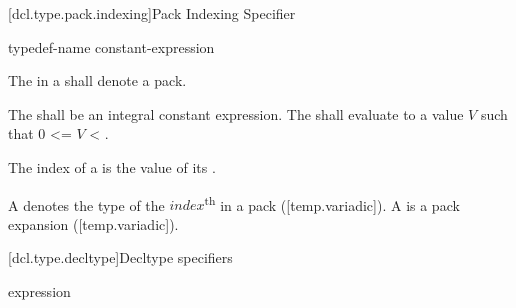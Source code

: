 \documentclass{wg21}
\begin{document}


\begin{addedblock}

[dcl.type.pack.indexing]{Pack Indexing Specifier}

\begin{bnf}
    \br
    typedef-name  \terminal{[} constant-expression \terminal{]}  \br
\end{bnf}

The  in a  shall denote a pack.

The  shall be an integral constant expression.
The  shall evaluate to a value $V$ such that 0 <= $V$ < .

The index of a  is the value of its .

A  denotes the type of the ${index}$\textsuperscript{th}  in a pack ([temp.variadic]).
A  is a pack expansion ([temp.variadic]).

\end{addedblock}



[dcl.type.decltype]{Decltype specifiers}%
%

\begin{bnf}
    \br
     \terminal{(} expression \terminal{)}
\end{bnf}
\end{document}

